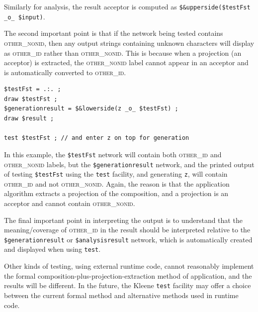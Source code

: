 \documentclass[letterpaper,12pt]{article}
\newcommand{\acro}{\textsc}
\begin{document}
\begin{samepage}
\begin{changebar}
\noindent
Similarly for analysis, the result acceptor is computed as 
\verb!$&upperside($testFst _o_ $input)!.

The second important point is that if the network being tested contains
\acro{other\_nonid}, then any output strings containing unknown characters
will display as \acro{other\_id} rather than \acro{other\_nonid}.  This is
because when a projection (an acceptor) is extracted, the
\acro{other\_nonid} label cannot appear in an acceptor and is
automatically converted to \acro{other\_id}.

\begin{Verbatim}[fontsize=\small]
$testFst = .:. ;
draw $testFst ;
$generationresult = $&lowerside(z _o_ $testFst) ;
draw $result ;

test $testFst ;	// and enter z on top for generation
\end{Verbatim}

\end{changebar}
\end{samepage}

\begin{samepage}
\begin{changebar}

\noindent
In this example, the \verb!$testFst! network will contain both
\acro{other\_id} and \acro{other\_nonid} labels, but the
\verb!$generationresult! network, and the printed output of testing
\verb!$testFst! using the \texttt{test} facility, and generating
\texttt{z}, will contain \acro{other\_id} and not \acro{other\_nonid}.
Again, the reason is that the application algorithm extracts a projection
of the composition, and a projection is an acceptor and cannot contain
\acro{other\_nonid}.

The final important point in interpreting the output is to understand
that the meaning/coverage of \acro{other\_id} in the result should be
interpreted relative to the \verb!$generationresult! or
\verb!$analysisresult! network, which is automatically created and
displayed when using \texttt{test}.

Other kinds of testing, using external runtime code, cannot reasonably
implement the formal composition-plus-projection-extraction method of
application, and the results will be different.  In the future, the
Kleene \texttt{test} facility may offer a choice between the current
formal method and alternative methods used in runtime code.

\end{changebar}
\end{samepage}
\end{document}
